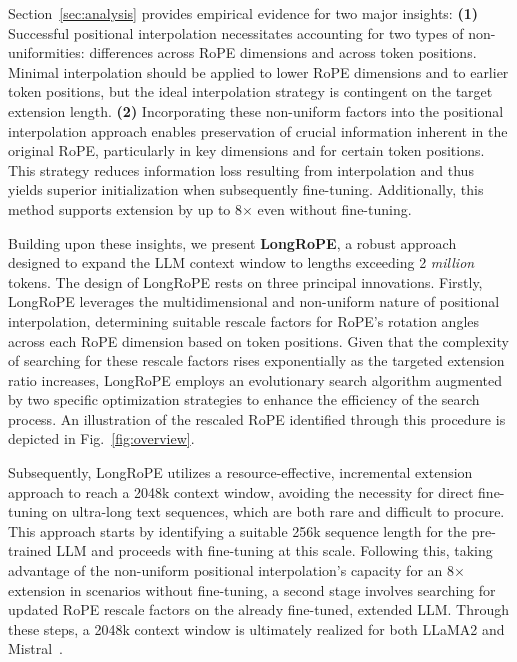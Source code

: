 Section~\ref{sec:analysis} provides empirical evidence for two major insights: \textbf{(1)} Successful positional interpolation necessitates accounting for two types of non-uniformities: differences across RoPE dimensions and across token positions. Minimal interpolation should be applied to lower RoPE dimensions and to earlier token positions, but the ideal interpolation strategy is contingent on the target extension length.
  \textbf{(2)} Incorporating these non-uniform factors into the positional interpolation approach enables preservation of crucial information inherent in the original RoPE, particularly in key dimensions and for certain token positions. This strategy reduces information loss resulting from interpolation and thus yields superior initialization when subsequently fine-tuning. Additionally, this method supports extension by up to 8$\times$ even without fine-tuning.

Building upon these insights, we present \textbf{LongRoPE}, a robust approach designed to expand the LLM context window to lengths exceeding 2 \emph{million} tokens. The design of LongRoPE rests on three principal innovations. Firstly, {LongRoPE} leverages the multidimensional and non-uniform nature of positional interpolation, determining suitable rescale factors for RoPE's rotation angles across each RoPE dimension based on token positions. Given that the complexity of searching for these rescale factors rises exponentially as the targeted extension ratio increases, {LongRoPE} employs an evolutionary search algorithm augmented by two specific optimization strategies to enhance the efficiency of the search process. An illustration of the rescaled RoPE identified through this procedure is depicted in Fig.~\ref{fig:overview}.

Subsequently, {LongRoPE} utilizes a resource-effective, incremental extension approach to reach a 2048k context window, avoiding the necessity for direct fine-tuning on ultra-long text sequences, which are both rare and difficult to procure. This approach starts by identifying a suitable 256k sequence length for the pre-trained LLM and proceeds with fine-tuning at this scale. Following this, taking advantage of the non-uniform positional interpolation’s capacity for an 8$\times$ extension in scenarios without fine-tuning, a second stage involves searching for updated RoPE rescale factors on the already fine-tuned, extended LLM. Through these steps, a 2048k context window is ultimately realized for both LLaMA2 and Mistral~\cite{mistral}.

